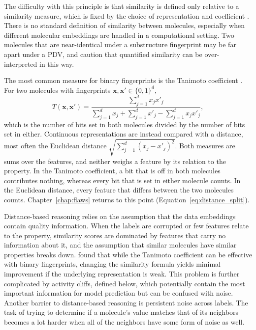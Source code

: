 The difficulty with this principle is that similarity is defined only relative to a similarity measure, which is fixed by the choice of representation and
coefficient \citep{Maggiora2014}. There is no standard definition of similarity between molecules, especially when different molecular embeddings are handled in a computational setting. Two molecules that are near-identical under a substructure fingerprint may be far apart under a PDV, and \citet{Maggiora2014} caution that quantified similarity can be over-interpreted in this way.

The most common measure for binary fingerprints is the Tanimoto coefficient \citep{Bajusz2015}. For two molecules with fingerprints $\mathbf{x}, \mathbf{x}' \in \{0,1\}^d$,
\begin{equation}
T(\mathbf{x}, \mathbf{x}') = \frac{\sum_{j=1}^{d} x_j x'_j}{\sum_{j=1}^{d} x_j + \sum_{j=1}^{d} x'_j - \sum_{j=1}^{d} x_j x'_j},
\label{eq:tanimoto}
\end{equation}
which is the number of bits set in both molecules divided by the number of bits set in either. Continuous representations are instead compared with a distance, most often the Euclidean distance $\sqrt{\sum_{j=1}^{d}(x_j - x'_j)^2}$. Both measures are sums over the features, and neither weighs a feature by its relation to the property. In the Tanimoto coefficient, a bit that is off in both molecules contributes nothing, whereas every bit that is set in either molecule counts. In the Euclidean distance, every feature that differs between the two molecules counts. Chapter~\ref{chap:flaws} returns to this point (Equation~\ref{eq:distance_split}).

Distance-based reasoning relies on the assumption that the data embeddings contain quality information. When the labels are corrupted or few features relate to the property, similarity scores are dominated by features that carry no information about it, and the assumption that similar molecules have similar properties breaks down. %
\citet{Bajusz2015} found that while the Tanimoto coefficient can be effective with binary fingerprints, changing the similarity formula yields minimal improvement if the underlying representation is weak.
This problem is further complicated by activity cliffs, defined below, which potentially contain the most important information for model prediction but can be confused with noise. Another barrier to distance-based reasoning is persistent noise across labels. The task of trying to determine if a molecule's value matches that of its neighbors becomes a lot harder when all of the neighbors have some form of noise as well.

